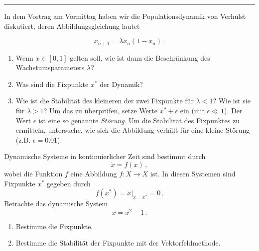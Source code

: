 

\usepackage{pstricks,pst-node,pst-tree}




  \sheet[%
  number=5,
  topic={Dynamische Systeme},
    ]

\vspace{-1cm}
\noindent\rule{12cm}{0.4pt}

  \exercise[%
  topic = Populationsdynamik in diskreter Zeit
  ]

  In dem Vortrag am Vormittag haben wir die Populationsdynamik von Verhulst
 diskutiert, deren Abbildungsgleichung lautet

  \begin{equation}
      x_{n+1} = \lambda x_n(1-x_n)\,.
  \end{equation}

  \begin{enumerate}
      \item Wenn $x\in [0,1]$ gelten soll,  wie ist dann die
          Beschr\"ankung des Wachstumsparameters $\lambda$?
      \item Was sind die Fixpunkte $x^*$ der Dynamik?
      \item Wie ist die Stabilit\"at des kleineren der zwei
          Fixpunkte f\"ur $\lambda<1$? Wie ist sie f\"ur $\lambda>1$?
          Um das zu \"uberpr\"ufen, setze Werte $x^*+\epsilon$ ein (mit
          $\epsilon\ll1$). Der Wert $\epsilon$ ist eine so genannte
          \textit{St\"orung}. Um die Stabilit\"at des Fixpunktes 
          zu ermitteln, untersuche, wie sich die Abbildung
          verh\"alt f\"ur eine kleine St\"orung (z.B. $\epsilon=0.01$).
  \end{enumerate}

    
  \exercise[%
  topic = Dynamische Systeme in kontinuierlicher Zeit
  ]

  Dynamische Systeme in kontinuierlicher Zeit sind bestimmt durch
  \begin{equation}
      \dot x = f(x)\,,
  \end{equation}
  wobei die Funktion $f$ eine Abbildung $f:X\rightarrow X$ ist. In
  diesen Systemen sind Fixpunkte $x^*$ gegeben durch
  \begin{equation}
      f(x^*) = \dot x|_{x=x^*} = 0\,.
  \end{equation}
  \subexercise
  Betrachte das dynamische System
  \begin{equation}
      \dot x = x^2 -1\,.
  \end{equation}
  \begin{enumerate}
      \item Bestimme die Fixpunkte.
      \item Bestimme die Stabilit\"at der Fixpunkte mit der
          Vektorfeldmethode.
  \end{enumerate}

